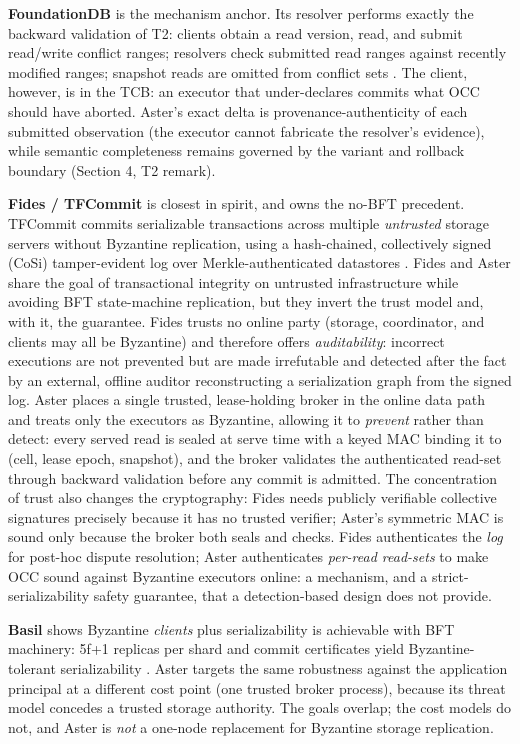 \documentclass[
  11pt,
]{article}
\begin{document}
\textbf{FoundationDB} is the mechanism anchor. Its resolver performs exactly the backward validation of T2: clients obtain a read version, read, and submit read/write conflict ranges; resolvers check submitted read ranges against recently modified ranges; snapshot reads are omitted from conflict sets \cite{fdb2021}. The client, however, is in the TCB: an executor that under-declares commits what OCC should have aborted. Aster's exact delta is provenance-authenticity of each submitted observation (the executor cannot fabricate the resolver's evidence), while semantic completeness remains governed by the variant and rollback boundary (Section 4, T2 remark).

\textbf{Fides / TFCommit} is closest in spirit, and owns the no-BFT precedent. TFCommit commits serializable transactions across multiple \emph{untrusted} storage servers without Byzantine replication, using a hash-chained, collectively signed (CoSi) tamper-evident log over Merkle-authenticated datastores \cite{fides2020}. Fides and Aster share the goal of transactional integrity on untrusted infrastructure while avoiding BFT state-machine replication, but they invert the trust model and, with it, the guarantee. Fides trusts no online party (storage, coordinator, and clients may all be Byzantine) and therefore offers \emph{auditability}: incorrect executions are not prevented but are made irrefutable and detected after the fact by an external, offline auditor reconstructing a serialization graph from the signed log. Aster places a single trusted, lease-holding broker in the online data path and treats only the executors as Byzantine, allowing it to \emph{prevent} rather than detect: every served read is sealed at serve time with a keyed MAC binding it to (cell, lease epoch, snapshot), and the broker validates the authenticated read-set through backward validation before any commit is admitted. The concentration of trust also changes the cryptography: Fides needs publicly verifiable collective signatures precisely because it has no trusted verifier; Aster's symmetric MAC is sound only because the broker both seals and checks. Fides authenticates the \emph{log} for post-hoc dispute resolution; Aster authenticates \emph{per-read read-sets} to make OCC sound against Byzantine executors online: a mechanism, and a strict-serializability safety guarantee, that a detection-based design does not provide.

\textbf{Basil} shows Byzantine \emph{clients} plus serializability is achievable with BFT machinery: 5f+1 replicas per shard and commit certificates yield Byzantine-tolerant serializability \cite{basil2021}. Aster targets the same robustness against the application principal at a different cost point (one trusted broker process), because its threat model concedes a trusted storage authority. The goals overlap; the cost models do not, and Aster is \emph{not} a one-node replacement for Byzantine storage replication.
\end{document}
